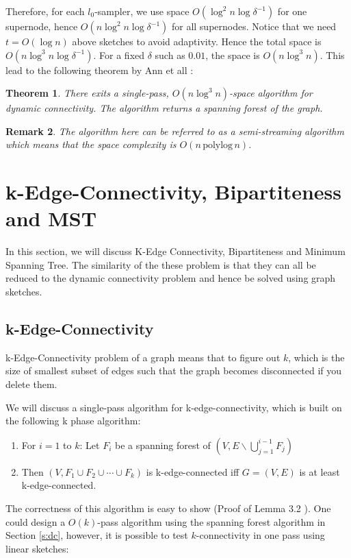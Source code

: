 \documentclass[11pt]{article}
\theoremstyle{plain}
\newtheorem{theorem}{Theorem}[section]
\newtheorem{remark}[theorem]{Remark}
\begin{document}
Therefore, for each $l_0$-sampler, we use space $O(\log^2 n \log \delta^{-1})$ 
for one supernode, hence $O(n\log^2 n \log \delta^{-1})$ for all supernodes. 
Notice that we need $t=O(\log n)$ above sketches to avoid adaptivity. Hence 
the total space is $O(n\log^3 n \log \delta^{-1})$. For a fixed $\delta$ such as 
$0.01$, the space is $O(n\log^3 n)$. This lead to the following theorem by Ann 
et all \cite{AGM2012-analyzing}:

\begin{theorem}
There exits a single-pass, $O(n\log^3 n)$-space algorithm for dynamic 
connectivity. The algorithm returns a spanning forest of the graph. 
\end{theorem}

\begin{remark}
The algorithm here can be referred to as a semi-streaming algorithm which 
means that the space complexity is $O(n\,\text{polylog}\,n)$.
\end{remark}

\section{k-Edge-Connectivity, Bipartiteness and MST}
In this section, we will discuss K-Edge Connectivity, Bipartiteness and Minimum 
Spanning Tree. The similarity of the these problem is that they can all be 
reduced to the dynamic connectivity problem and hence be solved using graph 
sketches. 

\subsection{k-Edge-Connectivity}
k-Edge-Connectivity problem of a graph means that to figure out $k$, which is 
the size of smallest subset of edges such that the graph becomes disconnected 
if you delete them. 

We will discuss a single-pass algorithm for k-edge-connectivity, which is built 
on the following k phase algorithm:

\begin{enumerate}
	\item For $i=1$ to $k$: Let $F_i$ be a spanning forest of $(V, 
	E\backslash\bigcup_{j=1}^{i-1}F_j)$
	\item Then $(V, F_1\cup F_2 \cup \cdots \cup F_k)$ is k-edge-connected iff 
	$G=(V, E)$ is at least k-edge-connected. 
\end{enumerate}

The correctness of this algorithm is easy to show (Proof of Lemma 3.2 
\cite{AGM2012-analyzing}). One could design a $O(k)$-pass algorithm using 
the spanning forest algorithm in Section \ref{s:dc}, however, it is possible to 
test $k$-connectivity in one pass using linear sketches:
\end{document}
